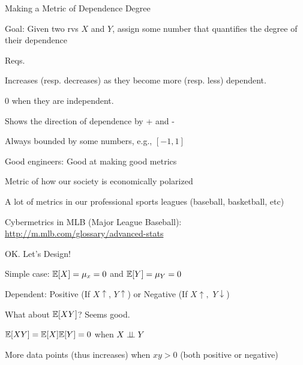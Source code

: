 \documentclass[handout,fleqn,aspectratio=169]{beamer}
\begin{document}
\begin{frame}{Making a Metric of Dependence Degree}

\plitemsep 0.05in

\bci 

\item<1-> Goal: Given two rvs $X$ and $Y$, assign some number that quantifies the degree of their dependence

\item<2-> Reqs. 
\bce[a)]
\item<3-> Increases (resp. decreases) as they become more (resp. less) dependent.
\item<4-> 0 when they are independent.
\item<5-> Shows the direction of dependence by + and -
\item<6-> Always bounded by some numbers, e.g., $[-1,1]$
\ece

\item<7-> Good engineers: Good at making good metrics

\smallskip
\bci
\item Metric of how our society is economically polarized
\item A lot of metrics in our professional sports leagues (baseball, basketball, etc)
\item Cybermetrics in MLB (Major League Baseball): \url{http://m.mlb.com/glossary/advanced-stats}
\eci

\eci

\end{frame}

\begin{frame}{OK. Let's Design!}

\plitemsep 0.1in

\bci 

\item<1-> Simple case: $\mathbb{E}[ X ] =\mu_x = 0$ and $\mathbb{E}[ Y ]=\mu_Y = 0$
\item<2-> Dependent: Positive (If $X \uparrow$, $Y \uparrow$) or Negative (If $X \uparrow,$ $Y \downarrow$)

\item<3-> What about $\mathbb{E}[ XY ]$? Seems good. 

\bci
\item<4-> $\mathbb{E}[ XY ] = \mathbb{E}[ X ]\mathbb{E}[ Y ]=0$ when $X \perp \!\!\! \perp Y$
\item<5-> More data points (thus increases) when $xy >0$ (both positive or negative)
\eci

{
\centering
{}
}
{
\bigskip
{}
}

\eci

\end{frame}
\end{document}
